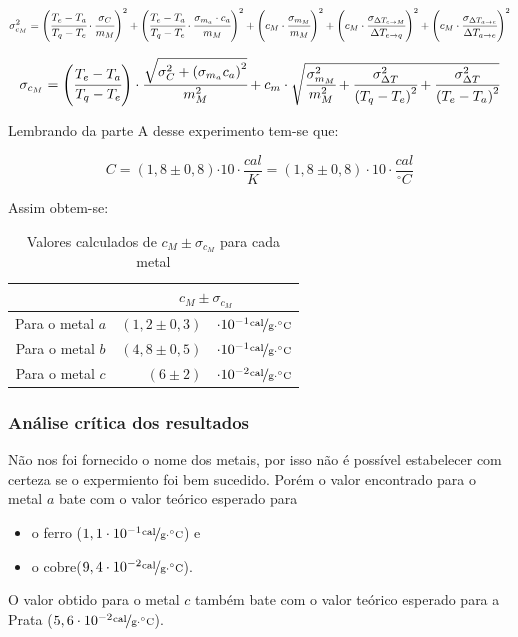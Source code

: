 \documentclass[a4paper]{article}
\providecommand{\tabularnewline}{\\}
\providecommand{\tabularnewline}{\\} %
\begin{document}
				\[
				\sigma_{c_{M}}^{2}=\left(\cfrac{T_{e}-T_{a}}{T_{q}-T_{e}}\cdot\cfrac{\sigma_{C}}{m_{M}}\right)^{2}+\left(\cfrac{T_{e}-T_{a}}{T_{q}-T_{e}}\cdot\cfrac{\sigma_{m_{a}}\cdot c_{a}}{m_{M}}\right)^{2}+\left(c_{M}\cdot\cfrac{\sigma_{m_{M}}}{m_{M}}\right)^{2}+\left(c_{M}\cdot\cfrac{\sigma_{\Delta T_{e\rightarrow M}}}{\Delta T_{e\rightarrow q}}\right)^{2}+\left(c_{M}\cdot\cfrac{\sigma_{\Delta T_{a\rightarrow e}}}{\Delta T_{a\rightarrow e}}\right)^{2}
				\]


				\begin{equation}
				\sigma_{c_{M}}=\left(\cfrac{T_{e}-T_{a}}{T_{q}-T_{e}}\right)\cdot\cfrac{\sqrt{\sigma_{C}^{2}+\left(\sigma_{m_{a}}c_{a}\right)^{2}}}{m_{M}^{2}}+c_{m}\cdot\sqrt{\cfrac{\sigma_{m_{M}}^{2}}{m_{M}^{2}}+\cfrac{\sigma_{\Delta T}^{2}}{\left(T_{q}-T_{e}\right)^{2}}+\cfrac{\sigma_{\Delta T}^{2}}{\left(T_{e}-T_{a}\right)^{2}}}
				\end{equation}


				Lembrando da parte A desse experimento tem-se que:

				\begin{equation}
				C=\left(1,8\pm0,8\right)\unit{\cdot10\cdot\frac{cal}{K}=\left(1,8\pm0,8\right)\cdot10\cdot}\frac{cal}{^{\circ}C}
				\end{equation}


				Assim obtem-se:

				\begin{table}[!ht]
				\caption{Valores calculados de $c_{M}\pm\sigma_{c_{M}}$ para cada metal}


				\centering{}%
				\begin{tabular}{|c|rl|}
				\cline{2-3} 
				\multicolumn{1}{c|}{} & \multicolumn{2}{c|}{$c_{M}\pm\sigma_{c_{M}}$}\tabularnewline
				\hline 
				Para o metal $a$  & $\left(1,2\pm0,3\right)$  & $\cdot10^{-1}\unitfrac{cal}{g\cdot^{\circ}C}$\tabularnewline
				\hline 
				Para o metal $b$  & $\left(4,8\pm0,5\right)$  & $\cdot10^{-1}\unitfrac{cal}{g\cdot^{\circ}C}$\tabularnewline
				\hline 
				Para o metal $c$  & $\left(6\pm2\right)$  & $\cdot10^{-2}\unitfrac{cal}{g\cdot^{\circ}C}$\tabularnewline
				\hline 
				\end{tabular}
				\end{table}

			\subsubsection{Análise crítica dos resultados}

				Não nos foi fornecido o nome dos metais, por isso não é possível estabelecer
				com certeza se o expermiento foi bem sucedido. Porém o valor encontrado
				para o metal $a$ bate com o valor teórico esperado para 
				\begin{itemize}
				\item o ferro ($1,1\cdot10^{-1}\unitfrac{cal}{g\cdot^{\circ}C}$) e 
				\item o cobre($9,4\cdot10^{-2}\unitfrac{cal}{g\cdot^{\circ}C}$). 
				\end{itemize}
				O valor obtido para o metal $c$ também bate com o valor teórico esperado
				para a Prata ($5,6\cdot10^{-2}\unitfrac{cal}{g\cdot^{\circ}C}$).
\end{document}
